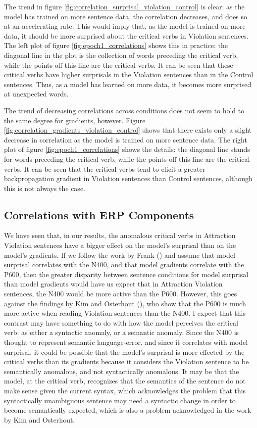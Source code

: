 \documentclass{IEEEtran}
\begin{document}
The trend in figure \ref{fig:correlation_surprisal_violation_control} is clear: as the model has trained on more sentence data, the correlation decreases, and does so at an accelerating rate.
This would imply that, as the model is trained on more data, it should be more surprised about the critical verbs in Violation sentences.
The left plot of figure \ref{fig:epoch1_correlations} shows this in practice: the diagonal line in the plot is the collection of words preceding the critical verb, while the points off this line are the critical verbs.
It can be seen that these critical verbs have higher surprisals in the Violation sentences than in the Control sentences.
Thus, as a model has learned on more data, it becomes more surprised at unexpected words.

The trend of decreasing correlations across conditions does not seem to hold to the same degree for gradients, however.
Figure \ref{fig:correlation_gradients_violation_control} shows that there exists only a slight decrease in correlation as the model is trained on more sentence data.
The right plot of figure \ref{fig:epoch1_correlations} shows the details: the diagonal line stands for words preceding the critical verb, while the points off this line are the critical verbs.
It can be seen that the critical verbs tend to elicit a greater backpropagation gradient in Violation sentences than Control sentences, although this is not always the case.

\subsection{Correlations with ERP Components}
We have seen that, in our results, the anomalous critical verbs in Attraction Violation sentences have a bigger effect on the model's surprisal than on the model's gradients.
If we follow the work by Frank (\cite{frank2024gradients}) and assume that model surprisal correlates with the N400, and that model gradients correlate with the P600, then the greater disparity between sentence conditions for model surprisal than model gradients would have us expect that in Attraction Violation sentences, the N400 would be more active than the P600.
However, this goes against the findings by Kim and Osterhout (\cite{kim2005combinatory}), who show that the P600 is much more active when reading Violation sentences than the N400.
I expect that this contrast may have something to do with how the model perceives the critical verb: as either a syntactic anomaly, or a semantic anomaly.
Since the N400 is thought to represent semantic language-error, and since it correlates with model surprisal, it could be possible that the model's surprisal is more effected by the critical verbs than its gradients because it considers the Violation sentence to be semantically anomalous, and not syntactically anomalous.
It may be that the model, at the critical verb, recognizes that the semantics of the sentence do not make sense given the current syntax, which acknowledges the problem that this syntactically unambiguous sentence may need a syntactic change in order to become semantically expected, which is also a problem acknowledged in the work by Kim and Osterhout.
\end{document}
